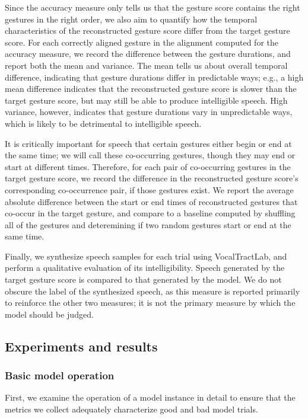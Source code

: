 Since the accuracy measure only tells us
that the gesture score contains
the right gestures in the right order,
we also aim to quantify
how the temporal characteristics
of the reconstructed gesture score
differ from the target gesture score.
For each correctly aligned gesture
in the alignment computed
for the accuracy measure,
we record the difference
between the gesture durations,
and report both the mean and variance.
The mean tells us about
overall temporal difference,
indicating that gesture durations
differ in predictable ways;
e.g., a high mean difference
indicates that
the reconstructed gesture score
is slower than the target gesture score,
but may still be able to
produce intelligible speech.
High variance, however,
indicates that
gesture durations vary in unpredictable ways,
which is likely to be detrimental
to intelligible speech.

It is critically important
for speech that certain gestures
either begin or end at the same time;
we will call these co-occurring gestures,
though they may end or start at different times.
Therefore, for each pair
of co-occurring gestures in the
target gesture score,
we record the difference
in the reconstructed gesture score's
corresponding co-occurrence pair,
if those gestures exist.
We report the average absolute
difference between the start or end times
of reconstructed gestures
that co-occur in the target gesture,
and compare to a baseline
computed by shuffling all of the gestures
and deteremining if two random gestures
start or end at the same time.

Finally, we synthesize speech samples
for each trial using VocalTractLab,
and perform a qualitative evaluation
of its intelligibility.
Speech generated by the
target gesture score is compared
to that generated by the model.
We do not obscure the label
of the synthesized speech,
as this measure is reported primarily
to reinforce the other two measures;
it is not the primary measure
by which the model should be judged.

\subsection{Experiments and results}

\subsubsection{Basic model operation}

First, we examine the operation
of a model instance in detail
to ensure that the metrics we collect
adequately characterize
good and bad model trials.

